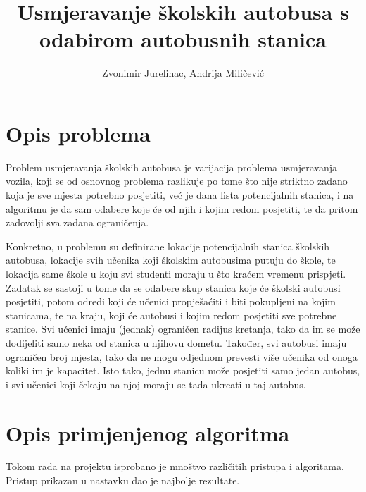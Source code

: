 \documentclass[times, utf8, seminar, numeric]{fer}
\begin{document}
\nocite{*}

\title{Usmjeravanje školskih autobusa s odabirom autobusnih stanica}

\author{Zvonimir Jurelinac, Andrija Miličević}


\maketitle

\tableofcontents

\chapter{Opis problema}
Problem usmjeravanja školskih autobusa je varijacija problema usmjeravanja vozila, koji se od osnovnog problema razlikuje po tome što nije striktno zadano koja je sve mjesta potrebno posjetiti, već je dana lista potencijalnih stanica, i na algoritmu je da sam odabere koje će od njih i kojim redom posjetiti, te da pritom zadovolji sva zadana ograničenja.

Konkretno, u problemu su definirane lokacije potencijalnih stanica školskih autobusa, lokacije svih učenika koji školskim autobusima putuju do škole, te lokacija same škole u koju svi studenti moraju u što kraćem vremenu prispjeti. Zadatak se sastoji u tome da se odabere skup stanica koje će školski autobusi posjetiti, potom odredi koji će učenici propješaćiti i biti pokupljeni na kojim stanicama, te na kraju, koji će autobusi i kojim redom posjetiti sve potrebne stanice. Svi učenici imaju (jednak) ograničen radijus kretanja, tako da im se može dodijeliti samo neka od stanica u njihovu dometu. Također, svi autobusi imaju ograničen broj mjesta, tako da ne mogu odjednom prevesti više učenika od onoga koliki im je kapacitet. Isto tako, jednu stanicu može posjetiti samo jedan autobus, i svi učenici koji čekaju na njoj moraju se tada ukrcati u taj autobus.

\chapter{Opis primjenjenog algoritma}
Tokom rada na projektu isprobano je mnoštvo različitih pristupa i algoritama. Pristup prikazan u nastavku dao je najbolje rezultate.
\end{document}
